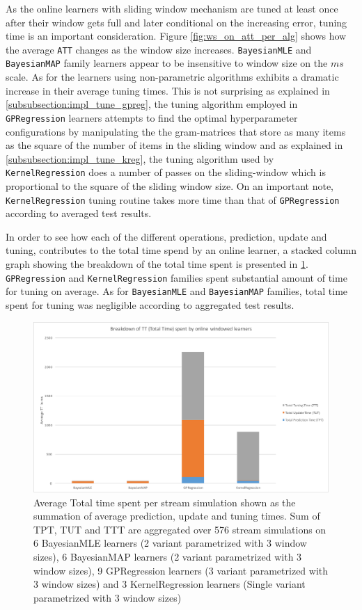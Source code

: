 As the online learners with sliding window mechanism are tuned at least once after their window gets full and later conditional on the increasing error, tuning time is an important consideration. Figure \ref{fig:ws_on_att_per_alg} shows how the average \texttt{ATT} changes as the window size increases. \texttt{BayesianMLE} and \texttt{BayesianMAP} family learners appear to be insensitive to window size on the $ms$ scale. As for the learners using non-parametric algorithms exhibits a dramatic increase in their average tuning times. This is not surprising as explained in \ref{subsubsection:impl_tune_gpreg}, the tuning algorithm employed in \texttt{GPRegression} learners attempts to find the optimal hyperparameter configurations by manipulating the the gram-matrices that store as many items as the square of the number of items in the sliding window and as explained in \ref{subsubsection:impl_tune_kreg}, the tuning algorithm used by \texttt{KernelRegression} does a number of passes on the sliding-window which is proportional to the square of the sliding window size. On an important note, \texttt{KernelRegression} tuning routine takes more time than that of \texttt{GPRegression} according to averaged test results.

In order to see how each of the different operations, prediction, update and tuning, contributes to the total time spend by an online learner, a stacked column graph showing the breakdown of the total time spent is presented in \ref{fig:total_time_breakdown}. \texttt{GPRegression} and \texttt{KernelRegression} families spent substantial amount of time for tuning on average. As for \texttt{BayesianMLE} and \texttt{BayesianMAP} families, total time spent for tuning was negligible according to aggregated test results.

\begin{figure}[htbp]
  \centering
    \includegraphics[width=\linewidth]{./Figures/total_time_breakdown.pdf}
  \caption{Average Total time spent per stream simulation shown as the summation of average prediction, update and tuning times. Sum of TPT, TUT and TTT are aggregated over 576 stream simulations on 6 BayesianMLE learners (2 variant parametrized with 3 window sizes), 6 BayesianMAP learners (2 variant parametrized with 3 window sizes), 9 GPRegression learners (3 variant parametrized with 3 window sizes) and 3 KernelRegression learners (Single variant parametrized with 3 window sizes)}
  \label{fig:total_time_breakdown}
\end{figure}

